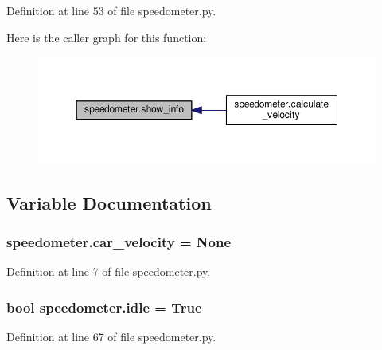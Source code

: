 Definition at line 53 of file speedometer.\+py.



Here is the caller graph for this function\+:
\nopagebreak
\begin{figure}[H]
\begin{center}
\leavevmode
\includegraphics[width=350pt]{namespacespeedometer_a7967d975c1e5c437230824172a16192c_icgraph}
\end{center}
\end{figure}




\subsection{Variable Documentation}
\subsubsection[{\texorpdfstring{car\+\_\+velocity}{car_velocity}}]{\setlength{\rightskip}{0pt plus 5cm}speedometer.\+car\+\_\+velocity = None}\hypertarget{namespacespeedometer_ae3da3978da28ccc499609198cdfcc8ac}{}\label{namespacespeedometer_ae3da3978da28ccc499609198cdfcc8ac}


Definition at line 7 of file speedometer.\+py.

\subsubsection[{\texorpdfstring{idle}{idle}}]{\setlength{\rightskip}{0pt plus 5cm}bool speedometer.\+idle = True}\hypertarget{namespacespeedometer_a0c05a122cf47c59aac7039707167c54e}{}\label{namespacespeedometer_a0c05a122cf47c59aac7039707167c54e}


Definition at line 67 of file speedometer.\+py.

